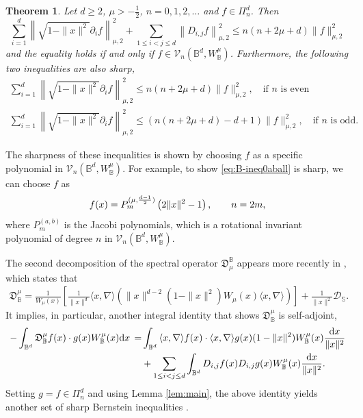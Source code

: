 \documentclass{amsart}
\newtheorem{thm}{Theorem}[section]
\theoremstyle{remark}
\def\la{{\langle}}
\def\ra{{\rangle}}
\def\d{\mathrm{d}}
\def\fD{{\mathfrak D}}
\def\la{{\langle}}
\def\ra{{\rangle}}
\def\CD{{\mathcal D}}
\def\CV{{\mathcal V}}
\def\BB{{\mathbb B}}
\def\SS{{\mathbb S}}
\def\f{\frac}
\begin{document}
\begin{thm} \label{thm:B-ineq0Ball}
Let $d \ge 2$, $\mu > -\f12$, $n = 0,1,2,\ldots$ and $f \in \Pi_n^d$. Then
\begin{equation} \label{eq:B-ineq0ball}
 \sum_{i=1}^d \left \| \sqrt{1-\|x\|^2} \partial_i f \right \|_{\mu,2}^2 + 
  \sum_{1\le i<j\le d} \left \|D_{i,j} f \right \|_{\mu,2}^2 \le n(n+2\mu+d) \|f \|_{\mu,2}^2
\end{equation}
and the equality holds if and only if $f \in \CV_n(\BB^d, W_\BB^\mu)$. 
Furthermore, the following two inequalities are also sharp,
\begin{align}
 \sum_{i=1}^d \left \| \sqrt{1-\|x\|^2} \partial_i f \right \|_{\mu,2}^2 \le n(n+2\mu+d) \|f \|_{\mu,2}^2, \quad \text{if $n$ is even}
  \label{eq:B-ineq0aball} \\ 
 \sum_{i=1}^d \left \| \sqrt{1-\|x\|^2} \partial_i f \right \|_{\mu,2}^2 \le (n(n+2\mu+d) -d+1) \|f \|_{\mu,2}^2, \quad \text{if $n$ is odd}.
  \label{eq:B-ineq0aOdd}
\end{align}
\end{thm}

The sharpness of these inequalities is shown by choosing $f$ as a specific polynomial in $\CV_n(\BB^d, W_\BB^\mu)$.
For example, to show \eqref{eq:B-ineq0aball} is sharp, we can choose $f$ as 
$$
   f(x) = P_m^{(\mu,\frac{d-1}{2})} \left(2\|x\|^2-1\right), \qquad \hbox{$n = 2m$},
$$
where $P_m^{(a,b)}$ is the Jacobi polynomials, which is a rotational invariant polynomial of degree $n$ in 
$\CV_n(\BB^d,W_\BB^\mu)$.

The second decomposition of the spectral operator $\fD_\mu^\BB$ appears more recently in \cite{BX}, which states that 
\begin{align} \label{fDBd3}
\fD^\mu_\BB = \frac{1}{W_\mu(x)} \left[ \frac{1}{\|x\|^d} \la x ,\nabla\ra \left(\|x\|^{d-2}(1-\|x\|^2) W_\mu(x)  \la x ,\nabla\ra \right)    \right] + \frac{1}{\|x\|^2} \CD_\SS.
\end{align}
It implies, in particular, another integral identity that shows $\fD_\BB^\mu$ is self-adjoint, 
\begin{align*}%
  -\int_{\BB^d} \fD_\BB^\mu f(x) \cdot g(x) W_\BB^\mu(x) \d x 
     \,= &  \int_{\BB^d} \la x ,\nabla \ra f(x) \cdot \la x ,\nabla \ra g(x) (1-\|x\|^2)W_\BB^\mu(x) \frac{\d x}{\|x\|^2} \\
      &  +  \sum_{1\le i<j\le d} \int_{\mathbb{B}^d} D_{i,j} f(x)  D_{i,j} g(x) W_\BB^\mu(x) \frac{\d x}{\|x\|^2}. \notag
\end{align*}
Setting $g = f \in \Pi_n^d$ and using Lemma \ref{lem:main}, the above identity yields another set of sharp 
Bernstein inequalities \cite{BX}. 
 
\end{document}
